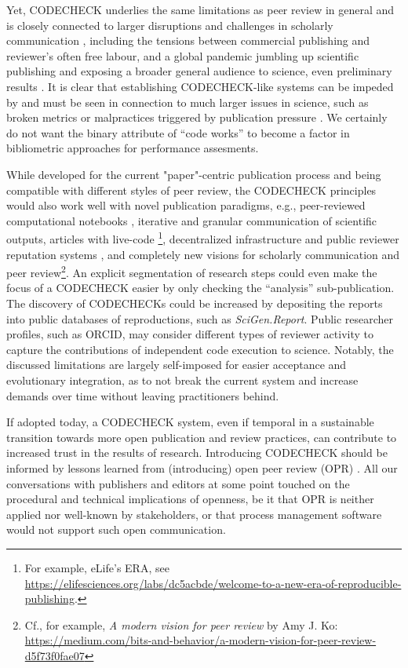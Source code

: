 \documentclass[12pt]{article}
\begin{document}
Yet, CODECHECK underlies the same limitations as peer review
in general and is closely connected to larger disruptions and challenges
in scholarly communication
\cite{eglen_recent_2018,tennant_ten_2019,fyfe_mission_2019}, 
including the tensions between commercial publishing and reviewer's often
free labour, and a global pandemic jumbling up scientific publishing
and exposing a broader general audience to science, even preliminary 
results \cite{munafo_what_2020}.
It is clear that establishing CODECHECK-like systems can be 
impeded by and must be seen in connection to much larger issues in 
science, such as broken metrics or malpractices triggered by publication
pressure \cite{piwowar_altmetrics:_2013,nosek_promoting_2015}.
We certainly do not want the binary attribute of ``code works''
to become a factor in bibliometric approaches for performance assesments.

While developed for the current "paper"-centric publication process and
being compatible with different styles of peer review, the CODECHECK 
principles would also work well with novel publication paradigms, e.g.,
peer-reviewed computational notebooks \cite{earthcube_new_2020},
iterative and granular communication of scientific outputs, 
articles with live-code \cite{perkel_pioneering_2019-1}
\footnote{For example, eLife's ERA, see 
\url{https://elifesciences.org/labs/dc5acbde/welcome-to-a-new-era-of-reproducible-publishing}.},
decentralized infrastructure and public reviewer reputation systems
\cite{tenorio-fornes_towards_2019},
and completely new visions for scholarly communication and peer 
review\footnote{Cf., for example, \emph{A modern vision for peer review} by 
Amy J. Ko: \url{https://medium.com/bits-and-behavior/a-modern-vision-for-peer-review-d5f73f0fae07}}.
An explicit segmentation of research steps could even make the focus 
of a CODECHECK easier by only checking the ``analysis'' sub-publication.
The discovery of CODECHECKs could be increased by depositing the reports
into public databases of reproductions, such as \emph{SciGen.Report}.
Public researcher profiles, such as ORCID, may consider different
types of reviewer activity to capture the contributions of independent 
code execution to science.
Notably, the discussed limitations are largely self-imposed for easier
acceptance and evolutionary integration, as to not break the current 
system and increase demands over time without leaving practitioners behind. 

If adopted today, a CODECHECK system, even if temporal in a sustainable 
transition towards more open publication and review practices, can contribute
to increased trust in the results of research. Introducing CODECHECK
should be informed by lessons learned from (introducing) open peer review
(OPR) \cite{ross-hellauer_guidelines_2019}.
All our conversations with publishers and editors at some point
touched on the procedural and technical implications of openness, be it 
that OPR is neither applied nor well-known by stakeholders, or that process
management software would not support such open communication.
\end{document}
